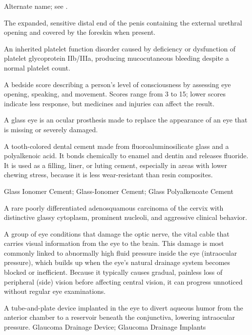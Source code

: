  Alternate name; see .

 The expanded, sensitive distal end of the penis containing the external urethral opening and covered by the foreskin when present.

 An inherited platelet function disorder caused by deficiency or dysfunction of platelet glycoprotein IIb/IIIa, producing mucocutaneous bleeding despite a normal platelet count.

 A bedside score describing a person’s level of consciousness by assessing eye opening, speaking, and movement. Scores range from 3 to 15; lower scores indicate less response, but medicines and injuries can affect the result.

 A glass eye is an ocular prosthesis made to replace the appearance of an eye that is missing or severely damaged.

 A tooth-colored dental cement made from fluoroaluminosilicate glass and a polyalkenoic acid. It bonds chemically to enamel and dentin and releases fluoride. It is used as a filling, liner, or luting cement, especially in areas with lower chewing stress, because it is less wear-resistant than resin composites.

\synonyms
Glass Ionomer Cement; Glass-Ionomer Cement; Glass Polyalkenoate Cement

 A rare poorly differentiated adenosquamous carcinoma of the cervix with distinctive glassy cytoplasm, prominent nucleoli, and aggressive clinical behavior.

 A group of eye conditions that damage the optic nerve, the vital cable that carries visual information from the eye to the brain. This damage is most commonly linked to abnormally high fluid pressure inside the eye (intraocular pressure), which builds up when the eye's natural drainage system becomes blocked or inefficient. Because it typically causes gradual, painless loss of peripheral (side) vision before affecting central vision, it can progress unnoticed without regular eye examinations.

 A tube-and-plate device implanted in the eye to divert aqueous humor from the anterior chamber to a reservoir beneath the conjunctiva, lowering intraocular pressure.
\synonyms
Glaucoma Drainage Device; Glaucoma Drainage Implants

